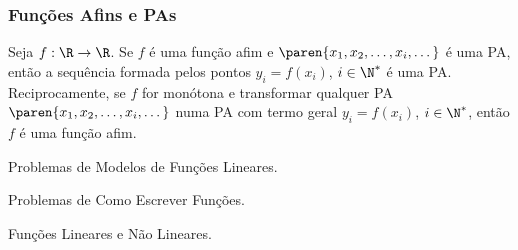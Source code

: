 \subsubsection{Funções Afins e PAs}

\begin{proposition}
Seja  $f: \R \to \R$. Se $f$ é uma função afim e $\paren{x_1, x_2,
\dots , x_i, \dots}$ é uma PA, então a sequência formada pelos
pontos $y_i = f(x_i)$, $i \in \N^*$ é uma PA. Reciprocamente,
se $f$ for monótona e transformar qualquer PA $\paren{x_1, x_2,
\dots , x_i, \dots}$ numa PA com termo geral $y_i = f(x_i)$, $i \in
\N^*$, então $f$ é uma função afim.    
\end{proposition}

\begin{onlineact}
    {Problemas de Modelos de Funções Lineares}.
\end{onlineact}

\begin{onlineact}
    {Problemas de Como Escrever Funções}.
\end{onlineact}

\begin{onlineact}
    {Funções Lineares e Não Lineares}.
\end{onlineact}